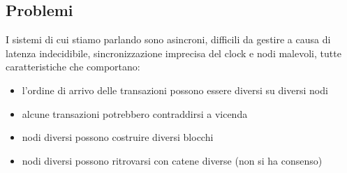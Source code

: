 \subsection{Problemi}
I sistemi di cui stiamo parlando sono asincroni, difficili da gestire a causa di latenza indecidibile, sincronizzazione imprecisa del clock e nodi malevoli, tutte caratteristiche che comportano:
\begin{itemize}
    \item l'ordine di arrivo delle transazioni possono essere diversi su diversi nodi
    \item alcune transazioni potrebbero contraddirsi a vicenda
    \item nodi diversi possono costruire diversi blocchi
    \item nodi diversi possono ritrovarsi con catene diverse (non si ha consenso)
\end{itemize}

